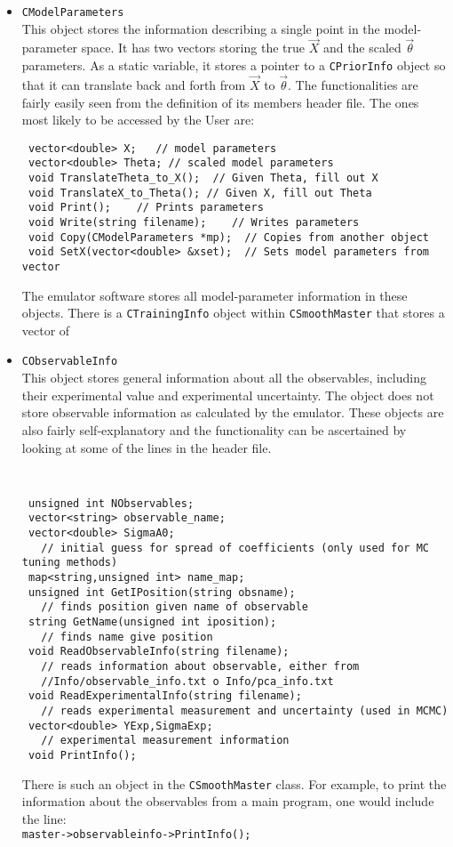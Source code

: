 \documentclass[UserManual.tex]{subfiles}
\begin{document}
\begin{itemize}
\item {\tt CModelParameters}\\
This object stores the information describing a single point in the model-parameter space. It has two vectors storing the true $\vec{X}$ and the scaled $\vec{\theta}$ parameters. As a static variable, it stores a pointer to a {\tt CPriorInfo} object so that it can translate back and forth from $\vec{X}$ to $\vec{\theta}$. The functionalities are fairly easily seen from the definition of its members header file. The ones most likely to be accessed by the User are:
{\tt\begin{verbatim}
 vector<double> X;   // model parameters
 vector<double> Theta; // scaled model parameters
 void TranslateTheta_to_X();  // Given Theta, fill out X
 void TranslateX_to_Theta(); // Given X, fill out Theta
 void Print();    // Prints parameters
 void Write(string filename);    // Writes parameters
 void Copy(CModelParameters *mp);  // Copies from another object
 void SetX(vector<double> &xset);  // Sets model parameters from vector
\end{verbatim}}
The emulator software stores all model-parameter information in these objects. There is a {\tt CTrainingInfo} object within {\tt CSmoothMaster} that stores a vector of 

\item {\tt CObservableInfo}\\
This object stores general information about all the observables, including their experimental value and experimental uncertainty. The object does not store observable information as calculated by the emulator. These objects are also fairly self-explanatory and the functionality can be ascertained by looking at some of the lines in the header file. 
{\tt
\begin{verbatim}
 unsigned int NObservables;
 vector<string> observable_name;
 vector<double> SigmaA0;
   // initial guess for spread of coefficients (only used for MC tuning methods)
 map<string,unsigned int> name_map;
 unsigned int GetIPosition(string obsname);
   // finds position given name of observable
 string GetName(unsigned int iposition);
   // finds name give position
 void ReadObservableInfo(string filename);
   // reads information about observable, either from
   //Info/observable_info.txt o Info/pca_info.txt 
 void ReadExperimentalInfo(string filename);
   // reads experimental measurement and uncertainty (used in MCMC)
 vector<double> YExp,SigmaExp;
   // experimental measurement information
 void PrintInfo();
\end{verbatim}}

There is such an object in the {\tt CSmoothMaster} class. For example, to print the information about the observables from a main program, one would include the line:\\
 {\tt master->observableinfo->PrintInfo();}


\end{itemize}
\end{document}
